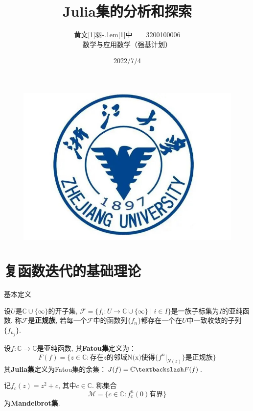 \documentclass[9pt]{beamer}
\title{Julia集的分析和探索}
\institute{浙江大学\ \ \ \ 数学科学学院}
\date{2022/7/4}
\begin{document}
\author{黄文\hbox{\scalebox{0.6}[1]{羽}\kern-.1em\scalebox{0.5}[1]{中}}\ \ \ \ 3200100006\\ 数学与应用数学（强基计划）}

\kaishu
\begin{frame}
    \titlepage
    \begin{figure}[htpb]
        \begin{center}
            \vspace*{-0.5cm}
            \includegraphics[width=0.2\linewidth]{pic/zju.jpg}
        \end{center}
    \end{figure}
\end{frame}

\begin{frame}
    \tableofcontents[sectionstyle=show,subsectionstyle=show/shaded/hide,subsubsectionstyle=show/shaded/hide]
\end{frame}


\section{复函数迭代的基础理论}

\begin{frame}{基本定义}
    \begin{definition}
        \small 设$U$是$\mathbb{C}\cup\{\infty\}$的开子集, $\mathcal{F}=\{f_i:U\to \mathbb{C}\cup\{\infty\}\;|\; i\in I\}$是一族子标集为$I$的亚纯函数. 称$\mathcal{F}$是\textbf{正规族}, 若每一个$\mathcal{F}$中的函数列$\{f_n\}$都存在一个在$U$中一致收敛的子列$\{f_{n_j}\}$. \cite{2014Fractals}
    \end{definition}

    \begin{definition}
        \small 设$f:\mathbb{C}\to\mathbb{C}$是亚纯函数, 其\textbf{Fatou集}定义为：
        \begin{equation*}
            F(f)=\{z\in\mathbb{C}:\text{存在}z\text{的邻域N(x)使得}\{f^n|_{N(z)}\}\text{是正规族}\}
        \end{equation*}
        其\textbf{Julia集}定义为Fatou集的余集：$J(f)=\mathbb{C}\textbackslash F(f)$. \cite{2014Fractals}
    \end{definition}

    \begin{definition}
        \small 记$f_c(z)=z^2+c$, 其中$c\in\mathbb{C}$. 称集合
        \begin{equation*}
            \mathcal{M}=\{c\in\mathbb{C}:f_c^{n}(0)\text{有界}\}
        \end{equation*}
        为\textbf{Mandelbrot集}.
    \end{definition}
\end{frame}
\end{document}
